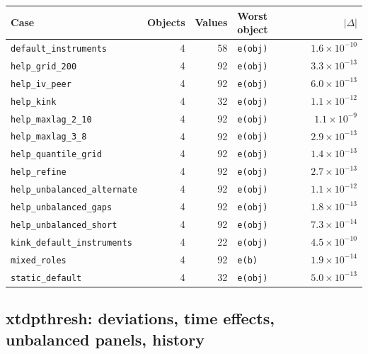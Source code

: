 \documentclass[10.5pt,a4paper]{article}
\begin{document}
\begin{longtable}{@{}p{3.6cm}rrp{4.9cm}r@{}}
\toprule
Case & Objects & Values & Worst object & $|\Delta|$ \\
\midrule
\endhead
\texttt{default\_\allowbreak{}instruments} & 4 & 58 & \texttt{e(obj)} & $1.6\times10^{-10}$ \\
\texttt{help\_\allowbreak{}grid\_\allowbreak{}200} & 4 & 92 & \texttt{e(obj)} & $3.3\times10^{-13}$ \\
\texttt{help\_\allowbreak{}iv\_\allowbreak{}peer} & 4 & 92 & \texttt{e(obj)} & $6.0\times10^{-13}$ \\
\texttt{help\_\allowbreak{}kink} & 4 & 32 & \texttt{e(obj)} & $1.1\times10^{-12}$ \\
\texttt{help\_\allowbreak{}maxlag\_\allowbreak{}2\_\allowbreak{}10} & 4 & 92 & \texttt{e(obj)} & $1.1\times10^{-9}$ \\
\texttt{help\_\allowbreak{}maxlag\_\allowbreak{}3\_\allowbreak{}8} & 4 & 92 & \texttt{e(obj)} & $2.9\times10^{-13}$ \\
\texttt{help\_\allowbreak{}quantile\_\allowbreak{}grid} & 4 & 92 & \texttt{e(obj)} & $1.4\times10^{-13}$ \\
\texttt{help\_\allowbreak{}refine} & 4 & 92 & \texttt{e(obj)} & $2.7\times10^{-13}$ \\
\texttt{help\_\allowbreak{}unbalanced\_\allowbreak{}alternate} & 4 & 92 & \texttt{e(obj)} & $1.1\times10^{-12}$ \\
\texttt{help\_\allowbreak{}unbalanced\_\allowbreak{}gaps} & 4 & 92 & \texttt{e(obj)} & $1.8\times10^{-13}$ \\
\texttt{help\_\allowbreak{}unbalanced\_\allowbreak{}short} & 4 & 92 & \texttt{e(obj)} & $7.3\times10^{-14}$ \\
\texttt{kink\_\allowbreak{}default\_\allowbreak{}instruments} & 4 & 22 & \texttt{e(obj)} & $4.5\times10^{-10}$ \\
\texttt{mixed\_\allowbreak{}roles} & 4 & 92 & \texttt{e(b)} & $1.9\times10^{-14}$ \\
\texttt{static\_\allowbreak{}default} & 4 & 32 & \texttt{e(obj)} & $5.0\times10^{-13}$ \\
\bottomrule
\end{longtable}

\subsection*{xtdpthresh: deviations, time effects, unbalanced panels, history}
\end{document}
